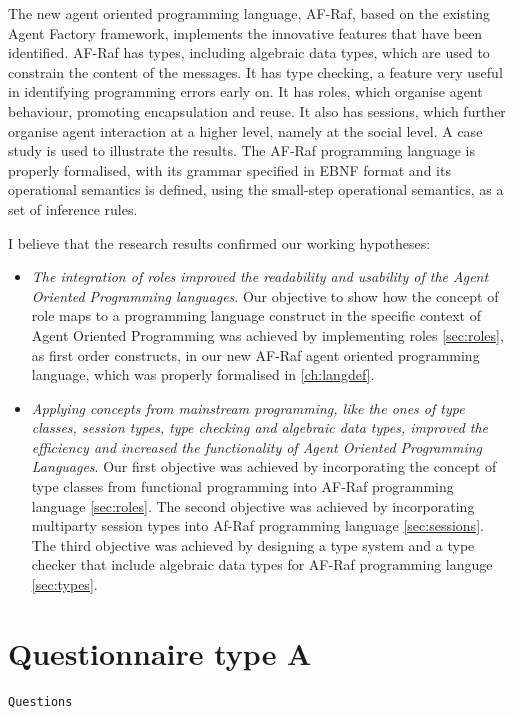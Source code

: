 \documentclass[a4paper,12pt,oneside,fleqn]{book} %
\begin{document}
{The new agent oriented programming language, AF-Raf, based on the existing
Agent Factory framework, implements the innovative features that have been
identified. AF-Raf has types, including algebraic data types, which are
used to constrain the content of the messages. It has type checking, a
feature very useful in identifying programming errors early on. It has
roles, which organise agent behaviour, promoting encapsulation and reuse.
It also has sessions, which further organise agent interaction at a higher
level, namely at the social level. A case study is used to illustrate the
results. The AF-Raf programming language is properly formalised, with its
grammar specified in EBNF format and its operational semantics is defined,
using the small-step operational semantics, as a set of inference rules.

I believe that the research results confirmed our working hypotheses:

\begin{itemize}
\item \textit{The integration of roles improved the readability and
usability of the Agent Oriented Programming languages}. Our objective to
show how the concept of role maps to a programming language construct in
the specific context of Agent Oriented Programming was achieved by
implementing roles \autoref{sec:roles}, as first order constructs, in our new AF-Raf
agent oriented programming language, which was properly formalised in
\autoref{ch:langdef}.

\item \textit{Applying concepts from mainstream programming, like the ones
  of type classes, session types, type checking and algebraic data types,
improved the efficiency and increased the functionality of Agent Oriented
Programming Languages}. Our first objective was achieved by incorporating
the concept of type classes from functional programming into AF-Raf
programming language \autoref{sec:roles}. The second objective was achieved
by incorporating multiparty session types into Af-Raf programming language
\autoref{sec:sessions}. The third objective was achieved by designing a
type system and a type checker that include algebraic data types for AF-Raf
programming languge \autoref{sec:types}.

\end{itemize}
\newpage
\appendix
\chapter{Questionnaire type A}\label{app:SurveyA} %
\begin{verbatim}
Questions


\end{verbatim}}
\end{document}
